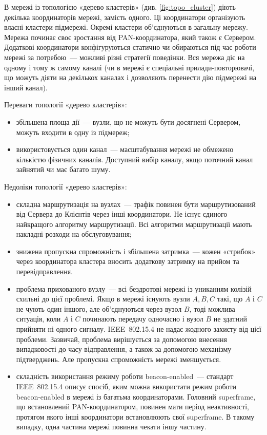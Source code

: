 \documentclass[a4paper,ukrainian,utf8,nocolumnsxix,floatsection,equationsection]{eskdtext}
\newcommand{\iee}[0]{IEEE~802.15.4\xspace}
\newcommand{\bem}[0]{beacon-enabled\xspace}
\begin{document}
В мережі із топологією «дерево кластерів» (див. \cref{fig:topo_cluster}) діють декілька координаторів мережі, замість одного. Ці координатори організують власні кластери-підмережі. Окремі кластери об'єднуються в загальну мережу. Мережа починає своє зростання від PAN-координатора, який також є Сервером. Додаткові координатори конфігуруються статично чи обираються під час роботи мережі за потребою~--- можливі різні стратегії поведінки. Вся мережа діє на одному і тому ж самому каналі (чи в мережі є спеціальні прилади-повторювачі, що можуть діяти на декількох каналах і дозволяють перенести дію підмережі на інший канал).

Переваги топології «дерево кластерів»:
\begin{itemize}
	\item збільшена площа дії~--- вузли, що не можуть бути досягнені Сервером, можуть входити в одну із підмереж;
	\item використовується один канал~--- масштабування мережі не обмежено кількістю фізичних каналів. Доступний вибір каналу, якщо поточний канал зайнятий чи має багато шуму.
\end{itemize}

Недоліки топології «дерево кластерів»:
\begin{itemize}
	\item складна маршрутизація на вузлах~--- трафік повинен бути маршрутизований від Сервера до Клієнтів через інші координатори. Не існує єдиного найкращого алгоритму маршрутизації. Всі алгоритми маршрутизації мають накладні розходи на обслуговування;
	\item знижена пропускна спроможність і збільшена затримка~--- кожен «стрибок» через координатора кластера вносить додаткову затримку на прийом та перевідправлення. 
	\item проблема прихованого вузлу~--- всі бездротові мережі із униканням колізій схильні до цієї проблемі. Якщо в мережі існують вузли $A,B,C$ такі, що $A$ і $C$ не чують один іншого, але об'єднуються через вузол $B$, тоді можлива ситуація, коли $A$ і $C$ починають передачу одночасно і вузол $B$ не здатний прийняти ні одного сигналу. \iee не надає жодного захисту від цієї проблеми. Зазвичай, проблема вирішується за допомогою внесення випадковості до часу відправлення, а також за допомогою механізму підтверджень. Але пропускна спроможність мережі зменшується.
	\item складність використання режиму роботи \bem~--- стандарт \iee описує спосіб, яким можна використати режим роботи \bem в мережі із багатьма координаторами. Головний superframe, що встановлений PAN-координатором, повинен мати період неактивності, протягом якого інші координатори встановлюють свої superframe. В такому випадку, одна частина мережі повинна чекати іншу частину.
\end{itemize}
\end{document}
